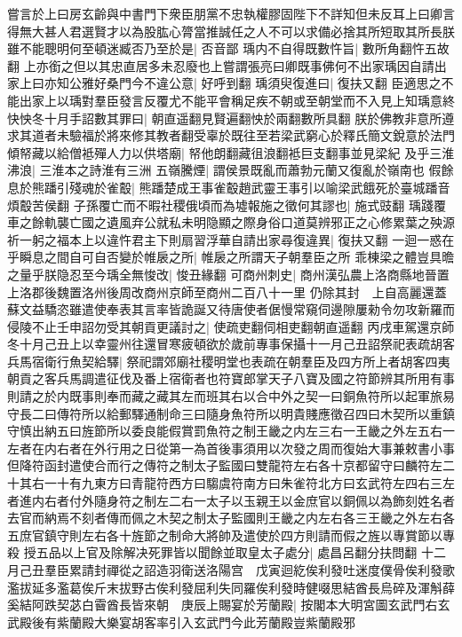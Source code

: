嘗言於上曰房玄齡與中書門下衆臣朋黨不忠執權膠固陛下不詳知但未反耳上曰卿言得無大甚人君選賢才以為股肱心膂當推誠任之人不可以求備必捨其所短取其所長朕雖不能聰明何至頓迷臧否乃至於是|{
	否音鄙}
瑀内不自得既數忤旨|{
	數所角翻忤五故翻}
上亦銜之但以其忠直居多未忍廢也上嘗謂張亮曰卿既事佛何不出家瑀因自請出家上曰亦知公雅好桑門今不違公意|{
	好呼到翻}
瑀須臾復進曰|{
	復扶又翻}
臣適思之不能出家上以瑀對羣臣發言反覆尤不能平會稱足疾不朝或至朝堂而不入見上知瑀意終快怏冬十月手詔數其罪曰|{
	朝直遥翻見賢遍翻怏於兩翻數所具翻}
朕於佛教非意所遵求其道者未驗福於將來修其教者翻受辜於既往至若梁武窮心於釋氏簡文銳意於法門傾帑藏以給僧袛殫人力以供塔廟|{
	帑他朗翻藏徂浪翻袛巨支翻事並見梁紀}
及乎三淮沸浪|{
	三淮本之詩淮有三洲}
五嶺騰煙|{
	謂侯景既亂而蕭勃元蘭又復亂於嶺南也}
假餘息於熊蹯引殘魂於雀鷇|{
	熊蹯楚成王事雀鷇趙武靈王事引以喻梁武餓死於臺城蹯音煩鷇苦侯翻}
子孫覆亡而不暇社稷俄頃而為墟報施之徵何其謬也|{
	施式豉翻}
瑀踐覆車之餘軌襲亡國之遺風弃公就私未明隐顯之際身俗口道莫辨邪正之心修累葉之殃源祈一躬之福本上以違忤君主下則扇習浮華自請出家尋復違異|{
	復扶又翻}
一迴一惑在乎瞬息之間自可自否變於帷扆之所|{
	帷扆之所謂天子朝羣臣之所}
乖棟梁之體豈具曕之量乎朕隐忍至今瑀全無悛改|{
	悛丑緣翻}
可商州刺史|{
	商州漢弘農上洛商縣地晉置上洛郡後魏置洛州後周改商州京師至商州二百八十一里}
仍除其封　上自高麗還蓋蘇文益驕恣雖遣使奉表其言率皆詭誕又待唐使者倨慢常窺伺邊隙屢勑令勿攻新羅而侵陵不止壬申詔勿受其朝貢更議討之|{
	使疏吏翻伺相吏翻朝直遥翻}
丙戌車駕還京師冬十月己丑上以幸靈州往還冒寒疲頓欲於歲前專事保攝十一月己丑詔祭祀表疏胡客兵馬宿衛行魚契給驛|{
	祭祀謂郊廟社稷明堂也表疏在朝羣臣及四方所上者胡客四夷朝貢之客兵馬調遣征伐及番上宿衛者也符寶郎掌天子八寶及國之符節辨其所用有事則請之於内既事則奉而藏之藏其左而班其右以合中外之契一曰銅魚符所以起軍旅易守長二曰傳符所以給郵驛通制命三曰隨身魚符所以明貴賤應徵召四曰木契所以重鎮守慎出納五曰旌節所以委良能假賞罰魚符之制王畿之内左三右一王畿之外左五右一左者在内右者在外行用之日從第一為首後事須用以次發之周而復始大事兼敕書小事但降符函封遣使合而行之傳符之制太子監國曰雙龍符左右各十京都留守曰麟符左二十其右一十有九東方曰青龍符西方曰騶虞符南方曰朱雀符北方曰玄武符左四右三左者進内右者付外隨身符之制左二右一太子以玉親王以金庶官以銅佩以為飾刻姓名者去官而納焉不刻者傳而佩之木契之制太子監國則王畿之内左右各三王畿之外左右各五庶官鎮守則左右各十旌節之制命大將帥及遣使於四方則請而假之旌以專賞節以專殺}
授五品以上官及除解决死罪皆以聞餘並取皇太子處分|{
	處昌呂翻分扶問翻}
十二月己丑羣臣累請封禪從之詔造羽衛送洛陽宫　戊寅迴紇俟利發吐迷度僕骨俟利發歌濫拔延多濫葛俟斤末拔野古俟利發屈利失同羅俟利發時健啜思結酋長烏碎及渾斛薛奚結阿跌契苾白霫酋長皆來朝　庚辰上賜宴於芳蘭殿|{
	按閣本大明宮圖玄武門右玄武殿後有紫蘭殿大樂宴胡客率引入玄武門今此芳蘭殿豈紫蘭殿邪}

